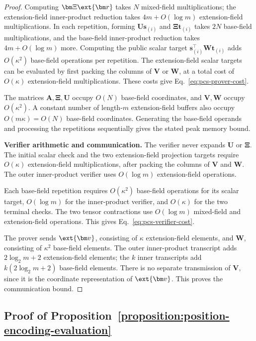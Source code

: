 \begin{proof}
Computing \(\bm\Xi\ext{\bm r}\) takes \(N\) mixed-field
multiplications; the extension-field inner-product reduction takes
\(4m+O(\log m)\) extension-field multiplications.
In each repetition, forming \(\bm U\bm s_{(i)}\) and
\(\bm\Xi\bm t_{(i)}\) takes \(2N\) base-field multiplications,
and the base-field inner-product reduction takes
\(4m+O(\log m)\) more.
Computing the public scalar target
\(\bm s_{(i)}^\top\bm W\bm t_{(i)}\) adds \(O(\kappa^2)\)
base-field operations per repetition.
The extension-field scalar targets can be evaluated by first
packing the columns of \(\bm V\) or \(\bm W\), at a total cost
of \(O(\kappa)\) extension-field multiplications.
These costs give Eq.~\eqref{eq:pcs-prover-cost}.

The matrices \(\bm A,\bm\Xi,\bm U\) occupy \(O(N)\) base-field
coordinates, and \(\bm V,\bm W\) occupy \(O(\kappa^2)\).
A constant number of length-\(m\) extension-field buffers also
occupy \(O(m\kappa)=O(N)\) base-field coordinates.
Generating the base-field operands and processing the repetitions
sequentially gives the stated peak memory bound.

\noindent\textbf{Verifier arithmetic and communication.}
The verifier never expands \(\bm U\) or \(\bm\Xi\).
The initial scalar check and the two extension-field projection
targets require \(O(\kappa)\) extension-field multiplications,
after packing the columns of \(\bm V\) and \(\bm W\).
The outer inner-product verifier uses \(O(\log m)\)
extension-field operations.

Each base-field repetition requires \(O(\kappa^2)\) base-field
operations for its scalar target, \(O(\log m)\) for the
inner-product verifier, and \(O(\kappa)\) for the two terminal checks.
The two tensor contractions use \(O(\log m)\) mixed-field and
extension-field operations.
This gives Eq.~\eqref{eq:pcs-verifier-cost}.

The prover sends \(\ext{\bm v}\), consisting of \(\kappa\)
extension-field elements, and \(\bm W\), consisting of
\(\kappa^2\) base-field elements.
The outer inner-product transcript adds \(2\log_2m+2\)
extension-field elements; the \(k\) inner transcripts add
\(k(2\log_2m+2)\) base-field elements.
There is no separate transmission of \(\bm V\), since it is the
coordinate representation of \(\ext{\bm v}\).
This proves the communication bound.
\end{proof}

\subsection{Proof of Proposition~\ref{proposition:position-encoding-evaluation}}
\label{appx:proof-position-encoding}

